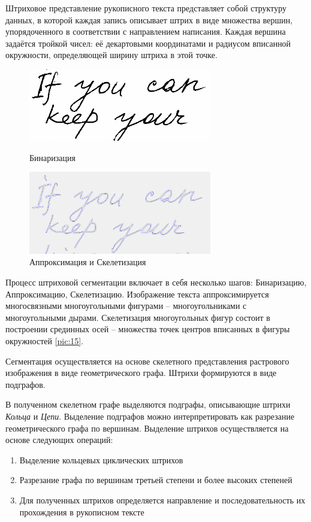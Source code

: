 \documentclass{article}
\begin{document}
    Штриховое представление рукописного текста представляет собой структуру данных, в которой каждая запись описывает штрих в виде множества вершин, упорядоченного в соответствии с направлением написания. Каждая вершина задаётся тройкой чисел: её декартовыми координатами и радиусом вписанной окружности, определяющей ширину штриха в этой точке. 

    \begin{figure}[H]
    \begin{minipage}[b]{0.5\textwidth}
        \centering
        \includegraphics[width=8cm]{img/mest4.png}
        \caption{Бинаризация}
	    \label{pic:14}
    \end{minipage}
     \hfill
    \begin{minipage}[b]{0.5\textwidth}
        \centering
        \includegraphics[width=8cm]{img/mest5.png}
        \caption{Аппроксимация и Скелетизация}
	    \label{pic:15}
    \end{minipage}
    \end{figure}
    
    Процесс штриховой сегментации включает в себя несколько шагов: Бинаризацию, Аппроксимацию, Скелетизацию. 
    Изображение текста аппроксимируется многосвязными многоугольными фигурами – многоугольниками с многоугольными дырами. Скелетизация многоугольных фигур состоит в построении срединных осей – множества точек центров вписанных в фигуры окружностей \autoref{pic:15}.

    Сегментация осуществляется на основе скелетного представления растрового изображения в виде геометрического графа. Штрихи формируются в виде подграфов.

    В полученном скелетном графе выделяются подграфы, описывающие штрихи \textit{Кольца} и \textit{Цепи}. 
    Выделение подграфов можно интерпретировать как разрезание геометрического графа по вершинам. Выделение штрихов осуществляется на основе следующих операций: 
    \begin{enumerate} 
        \item Выделение кольцевых циклических штрихов
        \item Разрезание графа по вершинам третьей степени и более высоких степеней
        \item Для полученных штрихов определяется направление и последовательность их прохождения в рукописном тексте
    \end{enumerate}
\end{document}
